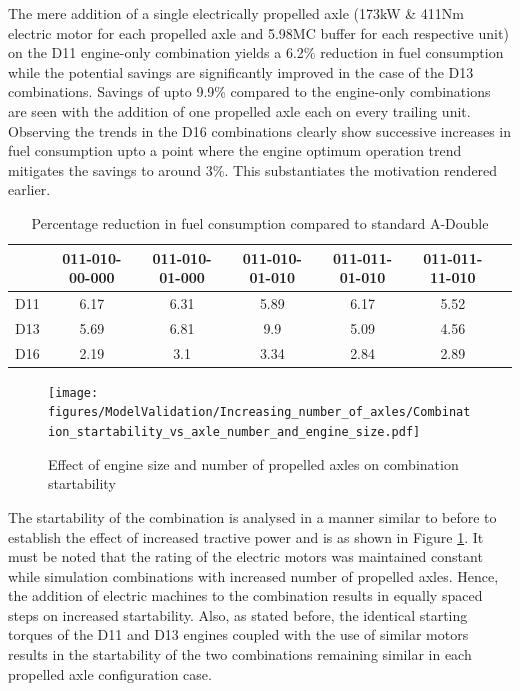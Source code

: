 \documentclass[ExampleMasters.tex]{subfiles}
\begin{document}
The mere addition of a single electrically propelled axle (173kW \& 411Nm electric motor for each propelled axle and 5.98MC buffer for each respective unit) on the D11 engine-only combination yields a 6.2\% reduction in fuel consumption while the potential savings are significantly improved in the case of the D13 combinations. Savings of upto 9.9\% compared to the engine-only combinations are seen with the addition of one propelled axle each on every trailing unit. Observing the trends in the D16 combinations clearly show successive increases in fuel consumption upto a point where the engine optimum operation trend mitigates the savings to around 3\%. This substantiates the motivation rendered earlier.\\

\begin{table}[h!]
\centering
\begin{tabular}{|c|c|c|c|c|c|c|}
\hline
& 011-010-00-000 & 011-010-01-000 & 011-010-01-010 & 011-011-01-010 & 011-011-11-010 \\
\hline
D11 & 6.17 & 6.31 & 5.89 & 6.17 & 5.52 \\
\hline
D13 & 5.69 & 6.81 & 9.9 & 5.09 & 4.56 \\
\hline
D16 & 2.19 & 3.1 & 3.34 & 2.84 & 2.89 \\
\hline
\end{tabular}
\caption{Percentage reduction in fuel consumption compared to standard A-Double}
\label{table:fuelConsumptionReductionAxles}
\end{table}

\begin{figure}[h!]
\centering
\texttt{[image: figures/ModelValidation/Increasing\_number\_of\_axles/Combination\_startability\_vs\_axle\_number\_and\_engine\_size.pdf]}
\caption{Effect of engine size and number of propelled axles on combination startability}
\label{startabilityEngineNumberOfAxles}
\end{figure}

The startability of the combination is analysed in a manner similar to before to establish the effect of increased tractive power and is as shown in Figure \ref{startabilityEngineNumberOfAxles}. It must be noted that the rating of the electric motors was maintained constant while simulation combinations with increased number of propelled axles. Hence, the addition of electric machines to the combination results in equally spaced steps on increased startability. Also, as stated before, the identical starting torques of the D11 and D13 engines coupled with the use of similar motors results in the startability of the two combinations remaining similar in each propelled axle configuration case.\\
\end{document}
